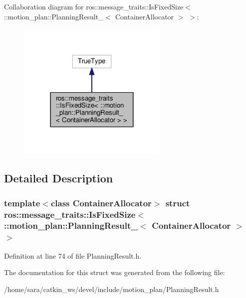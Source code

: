 Collaboration diagram for ros\+:\+:message\+\_\+traits\+:\+:Is\+Fixed\+Size$<$ \+:\+:motion\+\_\+plan\+:\+:Planning\+Result\+\_\+$<$ Container\+Allocator $>$ $>$\+:
\nopagebreak
\begin{figure}[H]
\begin{center}
\leavevmode
\includegraphics[width=204pt]{structros_1_1message__traits_1_1IsFixedSize_3_01_1_1motion__plan_1_1PlanningResult___3_01Containa042ce1b0f86c2df91f4d709fe0649a4}
\end{center}
\end{figure}


\subsection{Detailed Description}
\subsubsection*{template$<$class Container\+Allocator$>$\newline
struct ros\+::message\+\_\+traits\+::\+Is\+Fixed\+Size$<$ \+::motion\+\_\+plan\+::\+Planning\+Result\+\_\+$<$ Container\+Allocator $>$ $>$}



Definition at line 74 of file Planning\+Result.\+h.



The documentation for this struct was generated from the following file\+:\begin{DoxyCompactItemize}
\item 
/home/sara/catkin\+\_\+ws/devel/include/motion\+\_\+plan/Planning\+Result.\+h\end{DoxyCompactItemize}
